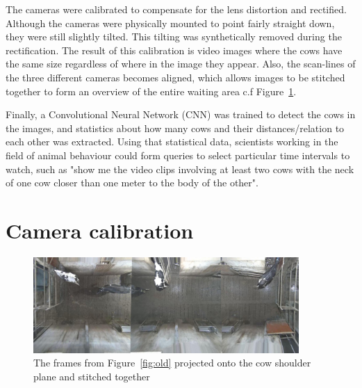 \documentclass{cta-author}
\begin{document}
The cameras were calibrated to compensate for the lens distortion and rectified. Although the cameras were physically mounted to point fairly straight down, they were still slightly tilted. This tilting was synthetically removed during the rectification. The result of this calibration is video images where the cows have the same size regardless of where in the image they appear. Also, the scan-lines of the three different cameras becomes aligned, which allows images to be stitched together to form an overview of the entire waiting area c.f Figure~\ref{fig:stitch}.

Finally, a Convolutional Neural Network (CNN)  was trained to detect the cows in the images, and statistics about how many cows and their distances/relation to each other was extracted. Using that statistical data, scientists working in the field of animal behaviour could form queries to select particular time intervals to watch, such as "show me the video clips involving at least two cows with the neck of one cow closer than one meter to the body of the other".


\section{Camera calibration}

\begin{figure}[t]
\begin{center}
  \includegraphics[width=0.9\textwidth]{full.jpg}
\end{center}
  \caption{The frames from Figure~\ref{fig:old} projected onto the cow shoulder plane and stitched together}
  \label{fig:stitch}
\end{figure}
\end{document}
